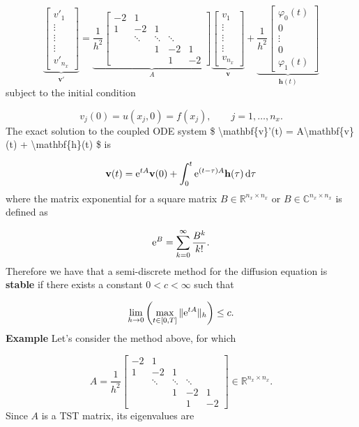 \documentclass[12pt,landscape]{article}
\begin{document}
{\[
\underbrace{\begin{bmatrix}
v'_{1} \\
\vdots \\
\vdots \\
\vdots \\
v'_{n_x}
\end{bmatrix}}_{\mathbf{v}'} = 
\underbrace{\frac{1}{h^2}\begin{bmatrix}
- 2 & 1 & & & \\
1  & -2 & 1  & & \\
      & \ddots & \ddots & \ddots & \\
      &        & 1    & -2 & 1 \\
      &        &        & 1 & -2
\end{bmatrix}}_{A}
\underbrace{\begin{bmatrix}
v_{1} \\
\vdots \\
\vdots \\
\vdots \\
v_{n_x}
\end{bmatrix}}_{\mathbf{v}}
+ 
\underbrace{\frac{1}{h^2}\begin{bmatrix}
\varphi_0(t) \\
0 \\
\vdots \\
0 \\
 \varphi_1(t)
\end{bmatrix}}_{\mathbf{h}(t)}
\]
subject to the initial condition

\[
v_j(0) = u(x_j,0) = f(x_j), \qquad j = 1, \ldots, n_x.
\]
The exact solution to the coupled ODE system \$ {\textbackslash}mathbf\{v\}'(t) = A{\textbackslash}mathbf\{v\}(t) + {\textbackslash}mathbf\{h\}(t)  \$ is

\[
\mathbf{v}(t) = {\rm e}^{tA}\mathbf{v}(0) + \int_0^t {\rm e}^{(t - \tau)A}\mathbf{h}(\tau)\,{\rm d}\tau
\]
where the matrix exponential for a square matrix $B \in \mathbb{R}^{n_x \times n_x}$ or $B \in \mathbb{C}^{n_x \times n_x}$ is defined as

\[
    {\rm e}^{B} = \sum_{k=0}^{\infty}\frac{B^k}{k!}.
\]
Therefore we have that a semi-discrete method for the diffusion equation is \textbf{stable} if there exists a constant $0 <c < \infty$ such that

\[
\lim_{h \to 0}\left(\max_{t \in [0, T]}\| {\rm e}^{tA}\|_h \right) \leq c.
\]
\textbf{Example} Let's consider the method above, for which 

\[
A = \frac{1}{h^2}\begin{bmatrix}
- 2 & 1 & & & \\
1  & -2 & 1  & & \\
      & \ddots & \ddots & \ddots & \\
      &        & 1    & -2 & 1 \\
      &        &        & 1 & -2
\end{bmatrix} \in \mathbb{R}^{n_x \times n_x}.
\]
Since $A$ is a TST matrix, its eigenvalues are

}
\end{document}
